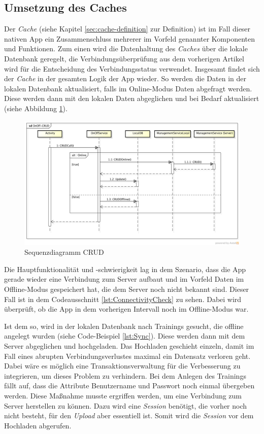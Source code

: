 \subsection{Umsetzung des Caches}
\label{ssec:nat-cache}
Der \textit{Cache} (siehe Kapitel \ref{sec:cache-definition} zur Definition) ist im Fall dieser nativen \gls{App} ein Zusammenschluss mehrerer im Vorfeld genannter Komponenten und Funktionen. Zum einen wird die Datenhaltung des \textit{Caches} über die lokale Datenbank geregelt, die Verbindungsüberprüfung aus dem vorherigen Artikel wird für die Entscheidung des Verbindungsstatus verwendet. Insgesamt findet sich der \textit{Cache} in der gesamten Logik der \gls{App} wieder. So werden die Daten in der lokalen Datenbank aktualisiert, falls im Online-Modus Daten abgefragt werden. Diese werden dann mit den lokalen Daten abgeglichen und bei Bedarf aktualisiert (siehe Abbildung \ref{pic:nat-CRUD}).\\
\begin{figure}[!h]
\centering
\includegraphics[width=\linewidth]{content/images/fITNat-OnOff-CRUD}
\caption{Sequenzdiagramm CRUD}
\label{pic:nat-CRUD}
\end{figure}


Die Hauptfunktionalität und -schwierigkeit lag in dem Szenario, dass die App gerade wieder eine Verbindung zum Server aufbaut und im Vorfeld Daten im Offline-Modus gespeichert hat, die dem Server noch nicht bekannt sind. Dieser Fall ist in dem Codeausschnitt \ref{lst:ConnectivityCheck} zu sehen. Dabei wird überprüft, ob die App in dem vorherigen Intervall noch im Offline-Modus war. 

Ist dem so, wird in der lokalen Datenbank nach Trainings gesucht, die offline angelegt wurden (siehe Code-Beispiel \ref{lst:Sync}). Diese werden dann mit dem Server abgeglichen und hochgeladen. Das Hochladen geschieht einzeln, damit im Fall eines abrupten Verbindungsverlustes maximal ein Datensatz verloren geht. Dabei wäre es möglich eine Transaktionsverwaltung für die Verbesserung zu integrieren, um dieses Problem zu verhindern. Bei dem Anlegen des Trainings fällt auf, dass die Attribute Benutzername und Passwort noch einmal übergeben werden. Diese Maßnahme musste ergriffen werden, um eine Verbindung zum Server herstellen zu können. Dazu wird eine \textit{Session} benötigt, die vorher noch nicht besteht, für den \textit{Upload} aber essentiell ist. Somit wird die \textit{Session} vor dem Hochladen abgerufen.